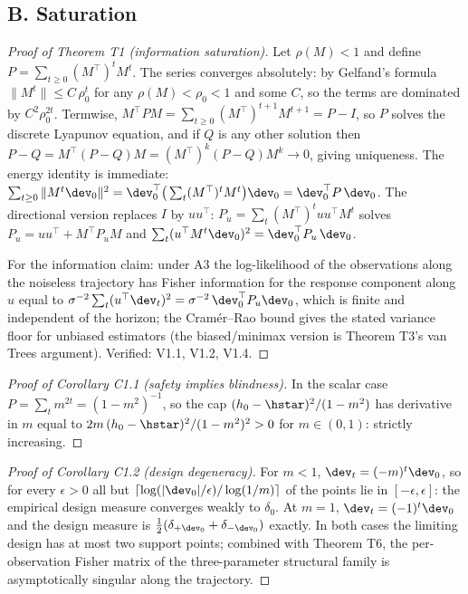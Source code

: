 \documentclass[11pt]{article}
\begin{document}
\subsection*{B. Saturation}

\begin{proof}[Proof of Theorem T1 (information saturation)]
Let $\rho(M) < 1$ and define $P = \sum_{t\ge 0} (M^\top)^t M^t$. The series
converges absolutely: by Gelfand's formula $\|M^t\| \le C\,\rho_0^t$ for any
$\rho(M) < \rho_0 < 1$ and some $C$, so the terms are dominated by
$C^2\rho_0^{2t}$. Termwise,
$M^\top P M = \sum_{t \ge 0} (M^\top)^{t+1}M^{t+1} = P - I$, so $P$ solves
the discrete Lyapunov equation, and if $Q$ is any other solution then
$P - Q = M^\top (P-Q) M = (M^\top)^k (P-Q) M^k \to 0$, giving uniqueness.
The energy identity is immediate:
$\sum_{t\ge 0} \|M^t \dev_0\|^2 = \dev_0^\top \big(\sum_t (M^\top)^t M^t\big)
\dev_0 = \dev_0^\top P\,\dev_0$. The directional version replaces $I$ by
$uu^\top$: $P_u = \sum_t (M^\top)^t uu^\top M^t$ solves
$P_u = uu^\top + M^\top P_u M$ and
$\sum_t (u^\top M^t \dev_0)^2 = \dev_0^\top P_u\,\dev_0$.

For the information claim: under A3 the log-likelihood of the observations
along the noiseless trajectory has Fisher information for the response
component along $u$ equal to $\sigma^{-2}\sum_t (u^\top \dev_t)^2 =
\sigma^{-2}\,\dev_0^\top P_u \dev_0$, which is finite and independent of the
horizon; the Cram\'er--Rao bound gives the stated variance floor for
unbiased estimators (the biased/minimax version is Theorem T3's van Trees
argument). Verified: V1.1, V1.2, V1.4.
\end{proof}

\begin{proof}[Proof of Corollary C1.1 (safety implies blindness)]
In the scalar case $P = \sum_t m^{2t} = (1-m^2)^{-1}$, so the cap
$(h_0-\hstar)^2/(1-m^2)$ has derivative in $m$ equal to
$2m\,(h_0-\hstar)^2/(1-m^2)^2 > 0$ for $m \in (0,1)$: strictly increasing.
\end{proof}

\begin{proof}[Proof of Corollary C1.2 (design degeneracy)]
For $m < 1$, $\dev_t = (-m)^t \dev_0$, so for every $\epsilon > 0$ all but
$\lceil \log(|\dev_0|/\epsilon)/\log(1/m)\rceil$ of the points lie in
$[-\epsilon, \epsilon]$: the empirical design measure converges weakly to
$\delta_0$. At $m = 1$, $\dev_t = (-1)^t \dev_0$ and the design measure is
$\tfrac{1}{2}(\delta_{+\dev_0} + \delta_{-\dev_0})$ exactly. In both cases
the limiting design has at most two support points; combined with Theorem
T6, the per-observation Fisher matrix of the three-parameter structural
family is asymptotically singular along the trajectory.
\end{proof}
\end{document}
